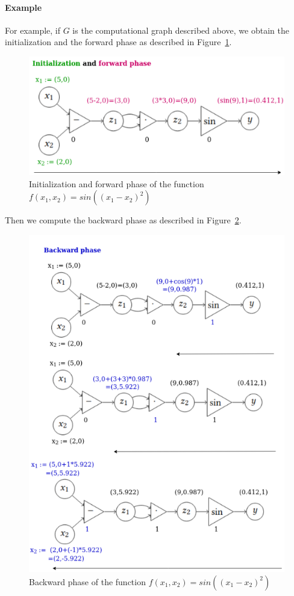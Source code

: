 \paragraph{Example} For example, if $G$ is the computational graph described above, we obtain the initialization and the forward phase as described in Figure~\ref{compGraph2IFM}.

\begin{figure}[h!]
	\centering
	\includegraphics[scale=0.5]{img/compGraph2IFM}
	\caption{Initialization and forward phase of the function $f(x_1,x_2)=sin((x_1-x_2)^2)$}
	\label{compGraph2IFM}
\end{figure}

Then we compute the backward phase as described in Figure~\ref{compGraph2BM}.

\begin{figure}[h!]
	\centering
	\includegraphics[scale=0.5]{img/compGraph2BM}
	\caption{Backward phase of the function $f(x_1,x_2)=sin((x_1-x_2)^2)$}
	\label{compGraph2BM}
\end{figure}

